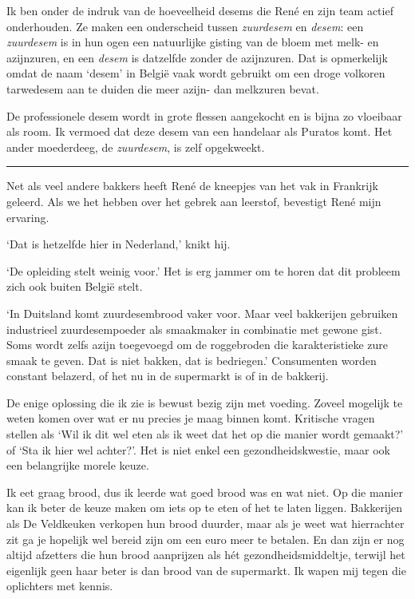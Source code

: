 \documentclass[
  11pt,
  dutch,
]{memoir}
\begin{document}
Ik ben onder de indruk van de hoeveelheid desems die René en zijn team
actief onderhouden. Ze maken een onderscheid tussen \emph{zuurdesem} en
\emph{desem}: een \emph{zuurdesem} is in hun ogen een natuurlijke
gisting van de bloem met melk- en azijnzuren, en een \emph{desem} is
datzelfde zonder de azijnzuren. Dat is opmerkelijk omdat de naam `desem'
in België vaak wordt gebruikt om een droge volkoren tarwedesem aan te
duiden die meer azijn- dan melkzuren bevat.

De professionele desem wordt in grote flessen aangekocht en is bijna zo
vloeibaar als room. Ik vermoed dat deze desem van een handelaar als
Puratos komt. Het ander moederdeeg, de \emph{zuurdesem}, is zelf
opgekweekt.

\pfbreak

Net als veel andere bakkers heeft René de kneepjes van het vak in
Frankrijk geleerd. Als we het hebben over het gebrek aan leerstof,
bevestigt René mijn ervaring.

`Dat is hetzelfde hier in Nederland,' knikt hij.

`De opleiding stelt weinig voor.' Het is erg jammer om te horen dat dit
probleem zich ook buiten België stelt.

`In Duitsland komt zuurdesembrood vaker voor. Maar veel bakkerijen
gebruiken industrieel zuurdesempoeder als smaakmaker in combinatie met
gewone gist. Soms wordt zelfs azijn toegevoegd om de roggebroden die
karakteristieke zure smaak te geven. Dat is niet bakken, dat is
bedriegen.' Consumenten worden constant belazerd, of het nu in de
supermarkt is of in de bakkerij.

De enige oplossing die ik zie is bewust bezig zijn met voeding. Zoveel
mogelijk te weten komen over wat er nu precies je maag binnen komt.
Kritische vragen stellen als `Wil ik dit wel eten als ik weet dat het op
die manier wordt gemaakt?' of `Sta ik hier wel achter?'. Het is niet
enkel een gezondheidskwestie, maar ook een belangrijke morele keuze.

Ik eet graag brood, dus ik leerde wat goed brood was en wat niet. Op die
manier kan ik beter de keuze maken om iets op te eten of het te laten
liggen. Bakkerijen als De Veldkeuken verkopen hun brood duurder, maar
als je weet wat hierrachter zit ga je hopelijk wel bereid zijn om een
euro meer te betalen. En dan zijn er nog altijd afzetters die hun brood
aanprijzen als hét gezondheidsmiddeltje, terwijl het eigenlijk geen haar
beter is dan brood van de supermarkt. Ik wapen mij tegen die oplichters
met kennis.
\end{document}
